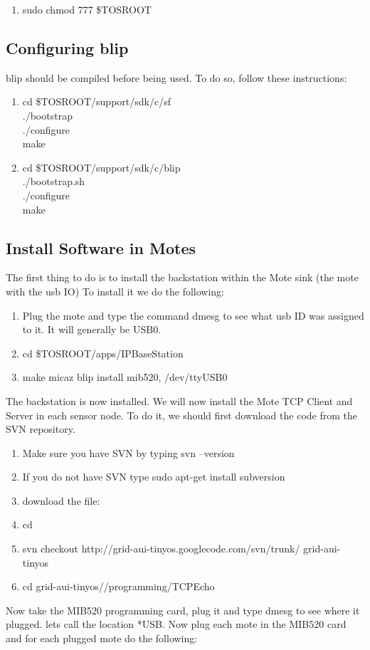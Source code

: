 \documentclass[oneside,12pt,a4paper,final]{book}
\begin{document}
\begin{appendices}
\begin{enumerate}
\item sudo chmod 777 \$TOSROOT
\end{enumerate}

\subsection{Configuring \gls{blip}}
\gls{blip} should be compiled before being used. To do so, follow these instructions:
\begin{enumerate}
\item cd \$TOSROOT/support/sdk/c/sf \\
./bootstrap \\
./configure \\
make 
\item cd \$TOSROOT/support/sdk/c/blip \\
./bootstrap.sh \\
./configure \\
make 
\end{enumerate}

\subsection{Install Software in Motes}
The first thing to do is to install the backstation within the Mote sink (the mote with the \gls{usb} IO) To install it we do the following:
\begin{enumerate}
\item Plug the mote and type the command dmesg to see what \gls{usb} ID was assigned to it. It will generally be USB0.
\item cd \$TOSROOT/apps/IPBaseStation
\item make micaz blip install  mib520, /dev/ttyUSB0
\end{enumerate}
The backstation is now installed. We will now install the Mote TCP Client and Server in each sensor node. To do it, we should first download the code from the SVN repository.
\begin{enumerate}
\item Make sure you have SVN by typing svn --version
\item If you do not have SVN type sudo apt-get install subversion
\item download the file:
\item cd
\item svn checkout http://grid-aui-tinyos.googlecode.com/svn/trunk/ grid-aui-tinyos
\item cd grid-aui-tinyos//programming/TCPEcho
\end{enumerate}
Now take the MIB520 programming card, plug it and type dmesg to see where it plugged. lets call the location *USB. Now plug each mote in the MIB520 card and for each plugged mote do the following:


\end{appendices}
\end{document}

